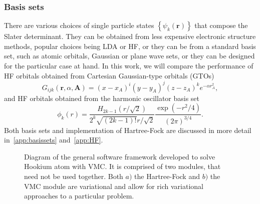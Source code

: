 \documentclass[final,3p,times,twocolumn]{elsarticle}
\begin{document}
	\subsubsection{Basis sets}
	There are various choices of single particle states $\left\{\psi_k(\mathbf{r})\right\}$ that compose the Slater determinant. They can be obtained from less expensive electronic structure methods, popular choices being LDA or HF, or they can be from a standard basis set, such as atomic orbitals, Gaussian or plane wave sets, or they can be designed for the particular case at hand. In this work, we will compare the performance of HF orbitals obtained from Cartesian Gaussian-type orbitals (GTOs)
	\begin{equation}
	\label{eq:cartG}
	G_{i j k}(\mathbf{r}, \alpha, \mathbf{A})=(x-x_{A})^{i} (y-y_{A})^{j} (z-z_{A})^{k} e^{-\alpha r_{A}^{2}},
	\end{equation}
	and HF orbitals obtained from the harmonic oscillator basis set
	\begin{equation}
		\phi_{k}(r)=\frac{H_{2 k-1}(r / \sqrt{2})}{2^{k} \sqrt{(2 k-1) !} r / \sqrt{2}} \frac{\exp \left(-r^{2} / 4\right)}{(2 \pi)^{3 / 4}}.
	\end{equation}
	Both basis sets and implementation of Hartree-Fock are discussed in more detail in~\ref{app:basissets} and~\ref{app:HF}.  
	
	\begin{figure}[h]
		\vspace*{-2cm}
		\caption{Diagram of the general software framework developed to solve Hookium atom with VMC. It is comprised of two modules, that need not be used together. Both $a)$ the Hartree-Fock and $b)$ the VMC module are variational and allow for rich variational approaches to a particular problem.}
		\label{fig:software}
	\end{figure}
	
\end{document}
